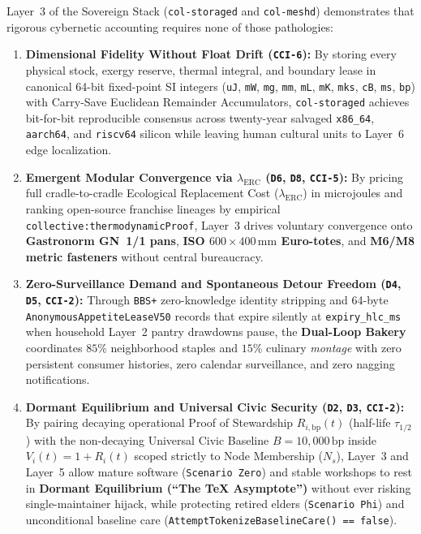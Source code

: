 Layer~3 of the Sovereign Stack (\texttt{col-storaged} and \texttt{col-meshd}) demonstrates that rigorous cybernetic accounting requires none of those pathologies:
\begin{enumerate}
    \item \textbf{Dimensional Fidelity Without Float Drift (\texttt{CCI-6}):} By storing every physical stock, exergy reserve, thermal integral, and boundary lease in canonical 64-bit fixed-point SI integers (\texttt{uJ}, \texttt{mW}, \texttt{mg}, \texttt{mm}, \texttt{mL}, \texttt{mK}, \texttt{mks}, \texttt{cB}, \texttt{ms}, \texttt{bp}) with Carry-Save Euclidean Remainder Accumulators, \texttt{col-storaged} achieves bit-for-bit reproducible consensus across twenty-year salvaged \texttt{x86\_64}, \texttt{aarch64}, and \texttt{riscv64} silicon while leaving human cultural units to Layer~6 edge localization.
    \item \textbf{Emergent Modular Convergence via $\lambda_{\mathrm{ERC}}$ (\texttt{D6}, \texttt{D8}, \texttt{CCI-5}):} By pricing full cradle-to-cradle Ecological Replacement Cost ($\lambda_{\mathrm{ERC}}$) in microjoules and ranking open-source franchise lineages by empirical \texttt{collective:thermodynamicProof}, Layer~3 drives voluntary convergence onto \textbf{Gastronorm GN~1/1 pans}, \textbf{ISO $600 \times 400\,\mathrm{mm}$ Euro-totes}, and \textbf{M6/M8 metric fasteners} without central bureaucracy.
    \item \textbf{Zero-Surveillance Demand and Spontaneous Detour Freedom (\texttt{D4}, \texttt{D5}, \texttt{CCI-2}):} Through \texttt{BBS+} zero-knowledge identity stripping and 64-byte \texttt{AnonymousAppetiteLeaseV50} records that expire silently at \texttt{expiry\_hlc\_ms} when household Layer~2 pantry drawdowns pause, the \textbf{Dual-Loop Bakery} coordinates $85\%$ neighborhood staples and $15\%$ culinary \textit{montage} with zero persistent consumer histories, zero calendar surveillance, and zero nagging notifications.
    \item \textbf{Dormant Equilibrium and Universal Civic Security (\texttt{D2}, \texttt{D3}, \texttt{CCI-2}):} By pairing decaying operational Proof of Stewardship $R_{i,\mathrm{bp}}(t)$ (half-life $\tau_{1/2}$) with the non-decaying Universal Civic Baseline $B = 10{,}000\,\mathrm{bp}$ inside $V_i(t) = 1 + R_i(t)$ scoped strictly to Node Membership ($N_s$), Layer~3 and Layer~5 allow mature software (\texttt{Scenario Zero}) and stable workshops to rest in \textbf{Dormant Equilibrium (``The TeX Asymptote'')} without ever risking single-maintainer hijack, while protecting retired elders (\texttt{Scenario Phi}) and unconditional baseline care (\texttt{AttemptTokenizeBaselineCare() == false}).

\end{enumerate}
